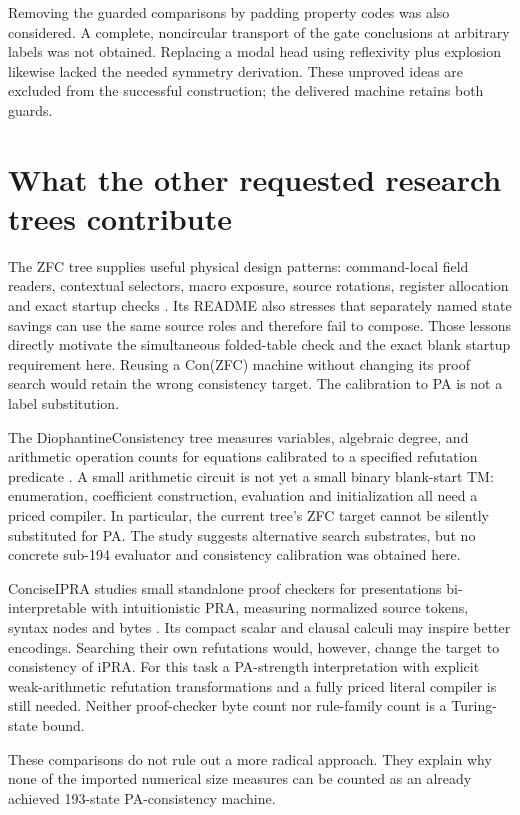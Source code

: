 \documentclass[10pt,a4paper]{article}
\theoremstyle{definition}
\begin{document}
Removing the guarded comparisons by padding property codes was also
considered. A complete, noncircular transport of the gate conclusions
at arbitrary labels was not obtained. Replacing a modal head using
reflexivity plus explosion likewise lacked the needed symmetry
derivation. These unproved ideas are excluded from the successful
construction; the delivered machine retains both guards.

\section{What the other requested research trees contribute}

The ZFC tree supplies useful physical design patterns: command-local
field readers, contextual selectors, macro exposure, source rotations,
register allocation and exact startup checks \cite{zfc}. Its README
also stresses that separately named state savings can use the same
source roles and therefore fail to compose. Those lessons directly
motivate the simultaneous folded-table check and the exact blank
startup requirement here. Reusing a Con(ZFC) machine without changing
its proof search would retain the wrong consistency target. The
calibration to PA is not a label substitution.

The DiophantineConsistency tree measures variables, algebraic degree,
and arithmetic operation counts for equations calibrated to a specified
refutation predicate \cite{dio}. A small arithmetic circuit is not yet
a small binary blank-start TM: enumeration, coefficient construction,
evaluation and initialization all need a priced compiler. In particular,
the current tree's ZFC target cannot be silently substituted for PA.
The study suggests alternative search substrates, but no concrete
sub-194 evaluator and consistency calibration was obtained here.

ConciseIPRA studies small standalone proof checkers for presentations
bi-interpretable with intuitionistic PRA, measuring normalized source
tokens, syntax nodes and bytes \cite{concise}. Its compact scalar and
clausal calculi may inspire better encodings. Searching their own
refutations would, however, change the target to consistency of iPRA.
For this task a PA-strength interpretation with explicit weak-arithmetic
refutation transformations and a fully priced literal compiler is still
needed. Neither proof-checker byte count nor rule-family count is a
Turing-state bound.

These comparisons do not rule out a more radical approach. They explain
why none of the imported numerical size measures can be counted as an
already achieved 193-state PA-consistency machine.
\end{document}
